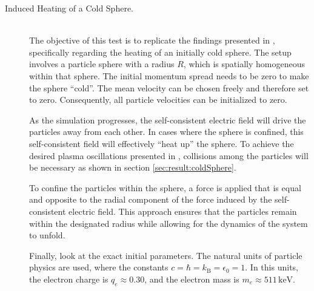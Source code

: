 \begin{description}
    \item[Induced Heating of a Cold Sphere.] \hfill \\
    The objective of this test is to replicate the findings presented in \cite[595]{Mitchell2015}, specifically regarding the heating of an initially cold sphere. The setup involves a particle sphere with a radius $R$, which is spatially homogeneous within that sphere. The initial momentum spread needs to be zero to make the sphere ``cold''. The mean velocity can be chosen freely and therefore set to zero. Consequently, all particle velocities can be initialized to zero.

    As the simulation progresses, the self-consistent electric field will drive the particles away from each other. In cases where the sphere is confined, this self-consistent field will effectively ``heat up'' the sphere. To achieve the desired plasma oscillations presented in \cite{Mitchell2015}, collisions among the particles will be necessary as shown in section \ref{sec:result:coldSphere}.
    
    To confine the particles within the sphere, a force is applied that is equal and opposite to the radial component of the force induced by the self-consistent electric field. This approach ensures that the particles remain within the designated radius while allowing for the dynamics of the system to unfold.

    Finally, look at the exact initial parameters. The natural units of particle physics are used, where the constants $ c = \hbar = k_\mathrm{B} = \epsilon_0 = 1$. In this units, the electron charge is $ q_e \approx 0.30 $, and the electron mass is  $m_e \approx 511\,\si{\kilo\electronvolt}$.


\end{description}
